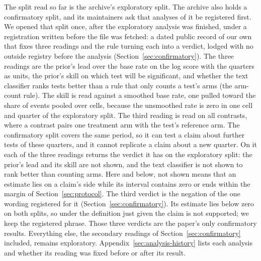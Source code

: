 \documentclass[sigconf,nonacm]{acmart}
\begin{document}
The split read so far is the archive's exploratory split. The archive also holds a confirmatory split, and its maintainers ask that analyses of it be registered first. We opened that split once, after the exploratory analysis was finished, under a registration written before the file was fetched: a dated public record of our own that fixes three readings and the rule turning each into a verdict, lodged with no outside registry before the analysis (Section~\ref{sec:confirmatory}). The three readings are the prior's lead over the base rate on the log score with the quarters as units, the prior's skill on which test will be significant, and whether the text classifier ranks tests better than a rule that only counts a test's arms (the arm-count rule). The skill is read against a smoothed base rate, one pulled toward the share of events pooled over cells, because the unsmoothed rate is zero in one cell and quarter of the exploratory split. The third reading is read on all contrasts, where a contrast pairs one treatment arm with the test's reference arm. The confirmatory split covers the same period, so it can test a claim about further tests of these quarters, and it cannot replicate a claim about a new quarter. On it each of the three readings returns the verdict it has on the exploratory split: the prior's lead and its skill are not shown, and the text classifier is not shown to rank better than counting arms. Here and below, not shown means that an estimate lies on a claim's side while its interval contains zero or ends within the margin of Section~\ref{sec:protocol}. The third verdict is the negation of the one wording registered for it (Section~\ref{sec:confirmatory}). Its estimate lies below zero on both splits, so under the definition just given the claim is not supported; we keep the registered phrase. Those three verdicts are the paper's only confirmatory results. Everything else, the secondary readings of Section~\ref{sec:confirmatory} included, remains exploratory. Appendix~\ref{sec:analysis-history} lists each analysis and whether its reading was fixed before or after its result.
\end{document}
